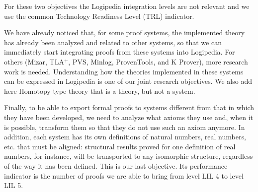 For these two objectives the Logipedia integration levels are not
relevant and we use the common Technology Readiness Level (TRL) indicator.

We have already noticed that, for some proof systems, the implemented
theory has already been analyzed and related to other systems, so that we can
immediately start integrating proofs from these systems into
Logipedia. For others (Mizar, TLA$^+$, PVS, Minlog, ProvenTools, and
K Prover), more research work is needed. Understanding how the
theories implemented in these systems can be expressed in Logipedia is
one of our joint research objectives. We also add here Homotopy type
theory that is a theory, but not a system.

Finally, to be able to export formal proofs to systems different from
that in which they have been developed, we need to analyze what axioms
they use and, when it is possible, transform them so that they do not
use such an axiom anymore.  In addition, each system has its own
definitions of natural numbers, real numbers, etc. that must be
aligned: structural results proved for one definition of real numbers,
for instance, will be transported to any isomorphic structure,
regardless of the way it has been defined. This is our last objective.
Its performance indicator is the number of proofs we are able to
bring from level LIL 4 to level LIL 5.

